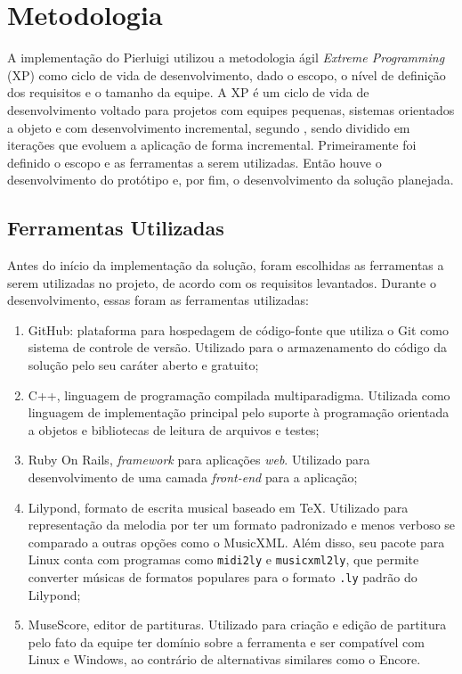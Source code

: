 \chapter[Metodologia]{Metodologia} \label{c2}

  A implementação do Pierluigi utilizou a metodologia ágil \textit{Extreme Programming} (XP) como ciclo de vida de desenvolvimento, dado o escopo, o nível de definição dos requisitos e o tamanho da equipe. A XP é um ciclo de vida de desenvolvimento voltado para projetos com equipes pequenas, sistemas orientados a objeto e com desenvolvimento incremental, segundo , sendo dividido em iterações que evoluem a aplicação de forma incremental. Primeiramente foi definido o escopo e as ferramentas a serem utilizadas. Então houve o desenvolvimento do protótipo e, por fim, o desenvolvimento da solução planejada.

  \section[Ferramentas Utilizadas]{Ferramentas Utilizadas}

    Antes do início da implementação da solução, foram escolhidas as ferramentas a serem utilizadas no projeto, de acordo com os requisitos levantados. Durante o desenvolvimento, essas foram as ferramentas utilizadas:

  \begin{enumerate}
    \item GitHub\footnotemark {}: plataforma para hospedagem de código-fonte que utiliza o Git como sistema de controle de versão. Utilizado para o armazenamento do código da solução pelo seu caráter aberto e gratuito;
    \item C++\footnotemark {}, linguagem de programação compilada multiparadigma. Utilizada como linguagem de implementação principal pelo suporte à programação orientada a objetos e bibliotecas de leitura de arquivos e testes;
    \item Ruby On Rails\footnotemark {}, \textit{framework} para aplicações \textit{web}. Utilizado para desenvolvimento de uma camada \textit{front-end} para a aplicação;
    \item Lilypond\footnotemark {}, formato de escrita musical baseado em TeX. Utilizado para representação da melodia por ter um formato padronizado e menos verboso se comparado a outras opções como o MusicXML. Além disso, seu pacote para Linux conta com programas como \lstinline{midi2ly} e \lstinline{musicxml2ly}, que permite converter músicas de formatos populares para o formato \lstinline{.ly} padrão do Lilypond;
    \item MuseScore\footnotemark {}, editor de partituras. Utilizado para criação e edição de partitura pelo fato da equipe ter domínio sobre a ferramenta e ser compatível com Linux e Windows, ao contrário de alternativas similares como o Encore.
  \end{enumerate}


